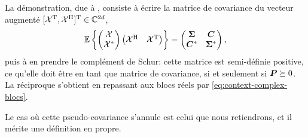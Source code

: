 \begin{remark}
  La démonstration, due à , consiste à écrire la matrice de covariance du vecteur augmenté $[\mathcal{X}^{\mathrm{T}},\mathcal{X}^{\mathrm{H}}]^{\mathrm{T}}\in\mathbb{C}^{2d}$,
  $$
  \operatorname{\mathbb{E}}\left\{
  \begin{pmatrix}\mathcal{X}\\{\mathcal{X}}^{*}\end{pmatrix}
  \begin{pmatrix}\mathcal{X}^{\mathrm{H}} & \mathcal{X}^{\mathrm{T}}\end{pmatrix}
  \right\}
  =
  \begin{pmatrix}
    \boldsymbol{\Sigma} & \boldsymbol{C} \\
    {\boldsymbol{C}}^{*} & {\boldsymbol{\Sigma}}^{*}
  \end{pmatrix},
  $$
  puis à en prendre le complément de Schur: cette matrice est semi-définie positive, ce qu'elle doit être en tant que matrice de covariance, si et seulement si $\boldsymbol{P}\succeq 0$. La réciproque s'obtient en repassant aux blocs réels par \cref{eq:context-complex-blocs}.

\end{remark}

Le cas où cette pseudo-covariance s'annule est celui que nous retiendrons, et il mérite une définition en propre.


